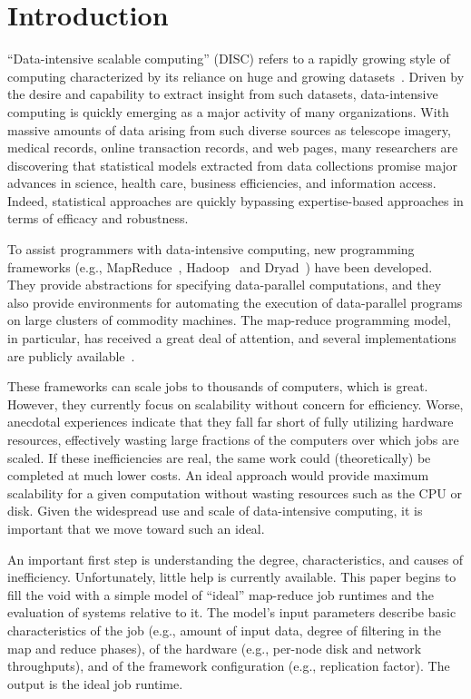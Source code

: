 \section{Introduction}
\label{sec:intro}


``Data-intensive scalable computing'' (DISC) refers to a rapidly growing style
of computing characterized by its reliance on huge and growing
datasets~\cite{disc}.  Driven by the desire and capability to extract
insight from such datasets, data-intensive computing is quickly
emerging as a major activity of many organizations.  With massive
amounts of data arising from such diverse sources as telescope
imagery, medical records, online transaction records, and web pages,
many researchers are discovering that statistical models extracted
from data collections promise major advances in science, health care,
business efficiencies, and information access.  Indeed, statistical
approaches are quickly bypassing expertise-based approaches in terms
of efficacy and robustness.

To assist programmers with data-intensive computing, new programming
frameworks (e.g., MapReduce~\cite{mapreduce}, Hadoop~\cite{hadoop} and
Dryad~\cite{dryad}) have been developed.  They provide abstractions
for specifying data-parallel computations, and they also provide
environments for automating the execution of data-parallel programs on
large clusters of commodity machines.  The map-reduce programming
model, in particular, has received a great deal of attention, and
several implementations are publicly available~\cite{hadoop, phoenix}.

These frameworks can scale jobs to thousands of computers, which is
great.  However, they currently focus on scalability without concern
for efficiency.  Worse, anecdotal experiences indicate that they fall
far short of fully utilizing hardware resources, effectively wasting
large fractions of the computers over which jobs are scaled.  If these
inefficiencies are real, the same work could (theoretically) be
completed at much lower costs.  An ideal approach would provide
maximum scalability for a given computation without wasting resources
such as the CPU or disk.  Given the widespread use and scale of
data-intensive computing, it is important that we move toward such an
ideal.

An important first step is understanding the degree, characteristics,
and causes of inefficiency.
Unfortunately, little help is currently available.
This paper begins to fill the void with a simple model of ``ideal'' map-reduce
job runtimes and the evaluation of systems relative to it.
The model's input parameters describe basic characteristics of the job
(e.g., amount of input data, degree of filtering in the map and reduce
phases), of the hardware (e.g., per-node disk and network throughputs),
and of the framework configuration (e.g., replication factor).
The output is the ideal job runtime.

